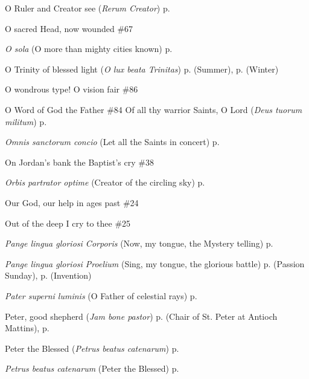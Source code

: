 \begin{hangparas}{1.25em}{1}
\par\noindent
O Ruler and Creator see (\textit{Rerum Creator}) \dotfill p. \pageref{WednesdayInvitatory}
\par\noindent
O sacred Head, now wounded  \dotfill \#67
\par\noindent
\textit{O sola} (O more than mighty cities known) \dotfill p. \pageref{EpiphanyMattins}
\par\noindent
O Trinity of blessed light (\textit{O lux beata Trinitas}) \dotfill p. \pageref{SaturdayEvensongSummer} (Summer), p. \pageref{SaturdayEvensongWinter} (Winter)
\par\noindent
O wondrous type! O vision fair \dotfill \#86
\par\noindent
O Word of God the Father \dotfill \#84
Of all thy warrior Saints, O Lord (\textit{Deus tuorum militum}) \dotfill p. \pageref{StephenEvensong}
\par\noindent
\textit{Omnis sanctorum concio} (Let all the Saints in concert) \dotfill p. \pageref{AnneEvensongII}
\par\noindent
On Jordan's bank the Baptist's cry \dotfill \#38
\par\noindent
\textit{Orbis partrator optime} (Creator of the circling sky) \dotfill p. \pageref{GuardianAngelsMattins}
\par\noindent
Our God, our help in ages past \dotfill \#24
\par\noindent
Out of the deep I cry to thee \dotfill \#25
\par\noindent
\textit{Pange lingua gloriosi Corporis} (Now, my tongue, the Mystery telling) \dotfill p. \pageref{CorpusChristiEvensong}
\par\noindent
\textit{Pange lingua gloriosi Proelium} (Sing, my tongue, the glorious battle) \dotfill p. \pageref{PassionSundayInvitatory} (Passion Sunday), p. \pageref{InventionInvitatory} (Invention)
\par\noindent
\textit{Pater superni luminis} (O Father of celestial rays) \dotfill p. \pageref{MaryMagdaleneEvensong}
\par\noindent
Peter, good shepherd (\textit{Jam bone pastor}) \dotfill p. \pageref{PeterAntiochMattins} (Chair of St. Peter at Antioch Mattins), p. \pageref{PeterMattins}
\par\noindent
Peter the Blessed (\textit{Petrus beatus catenarum}) \dotfill p. \pageref{LammasEvensong}
\par\noindent
\textit{Petrus beatus catenarum} (Peter the Blessed) \dotfill p. \pageref{LammasEvensong}
\par\noindent

\end{hangparas}
